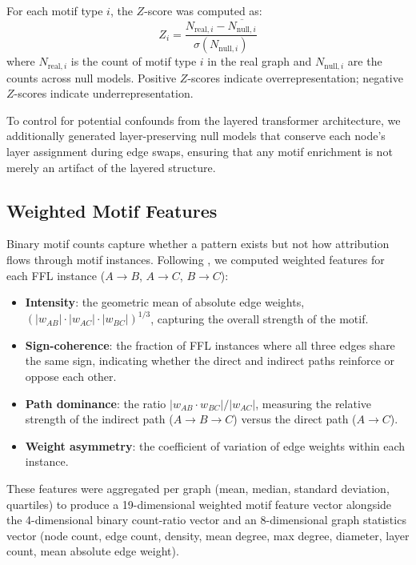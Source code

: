 \documentclass[11pt,letterpaper]{article}
\begin{document}
For each motif type $i$, the $Z$-score was computed as:
\begin{equation}
  Z_i = \frac{N_{\text{real},i} - \overline{N_{\text{null},i}}}{\sigma(N_{\text{null},i})}
  \label{eq:zscore}
\end{equation}
where $N_{\text{real},i}$ is the count of motif type $i$ in the real graph and $N_{\text{null},i}$ are the counts across null models. Positive $Z$-scores indicate overrepresentation; negative $Z$-scores indicate underrepresentation.

To control for potential confounds from the layered transformer architecture, we additionally generated layer-preserving null models that conserve each node's layer assignment during edge swaps, ensuring that any motif enrichment is not merely an artifact of the layered structure.

\subsection{Weighted Motif Features}

Binary motif counts capture whether a pattern exists but not how attribution flows through motif instances. Following \citet{Onnela2005}, we computed weighted features for each FFL instance ($A \to B$, $A \to C$, $B \to C$):

\begin{itemize}
  \item \textbf{Intensity}: the geometric mean of absolute edge weights, $(|w_{AB}| \cdot |w_{AC}| \cdot |w_{BC}|)^{1/3}$, capturing the overall strength of the motif.
  \item \textbf{Sign-coherence}: the fraction of FFL instances where all three edges share the same sign, indicating whether the direct and indirect paths reinforce or oppose each other.
  \item \textbf{Path dominance}: the ratio $|w_{AB} \cdot w_{BC}| / |w_{AC}|$, measuring the relative strength of the indirect path ($A \to B \to C$) versus the direct path ($A \to C$).
  \item \textbf{Weight asymmetry}: the coefficient of variation of edge weights within each instance.
\end{itemize}

These features were aggregated per graph (mean, median, standard deviation, quartiles) to produce a 19-dimensional weighted motif feature vector alongside the 4-dimensional binary count-ratio vector and an 8-dimensional graph statistics vector (node count, edge count, density, mean degree, max degree, diameter, layer count, mean absolute edge weight).
\end{document}
